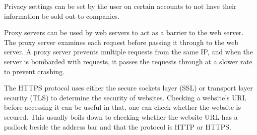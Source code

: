 Privacy settings can be set by the user on certain accounts to not have their information be sold
out to companies.

Proxy servers can be used by web servers to act as a barrier to the web server. The proxy server
examines each request before passing it through to the web server. A proxy server prevents 
multiple requests from the same IP, and when the server is bombarded with requests, it passes
the requests through at a slower rate to prevent crashing.

The HTTPS protocol uses either the secure sockets layer (SSL) or transport layer security (TLS)
to determine the security of websites. Checking a website's URL before accessing it can be
useful in that, one can check whether the website is secured. This usually boils down to checking
whether the website URL has a padlock beside the address bar and that the protocol is HTTP or
HTTPS.
